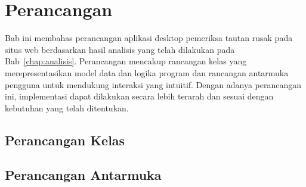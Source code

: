 \chapter{Perancangan}
\label{chap:perancangan}

Bab ini membahas perancangan aplikasi desktop pemeriksa tautan rusak pada situs web berdasarkan hasil analisis yang telah dilakukan pada Bab~\ref{chap:analisis}. Perancangan mencakup rancangan kelas yang merepresentasikan model data dan logika program dan rancangan antarmuka pengguna untuk mendukung interaksi yang intuitif. Dengan adanya perancangan ini, implementasi dapat dilakukan secara lebih terarah dan sesuai dengan kebutuhan yang telah ditentukan.


\section{Perancangan Kelas}
\label{sec:04-perancangan-kelas}



\section{Perancangan Antarmuka}
\label{sec:04-perancangan-antarmuka}

